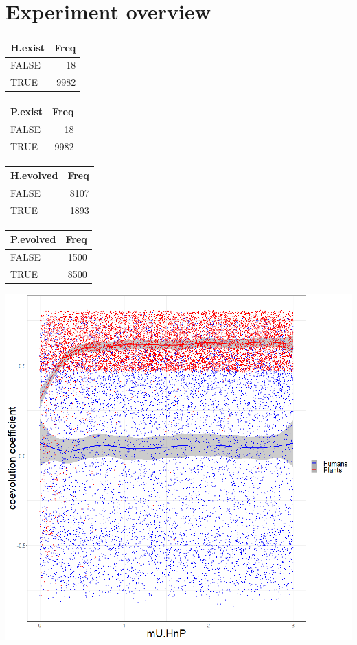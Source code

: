 \documentclass[]{book}
\begin{document}
\newpage

\hypertarget{experiment-overview}{%
\section{Experiment overview}\label{experiment-overview}}

\begin{tabular}{l|r}
\hline
H.exist & Freq\\
\hline
FALSE & 18\\
\hline
TRUE & 9982\\
\hline
\end{tabular}

\begin{tabular}{l|r}
\hline
P.exist & Freq\\
\hline
FALSE & 18\\
\hline
TRUE & 9982\\
\hline
\end{tabular}

\begin{tabular}{l|r}
\hline
H.evolved & Freq\\
\hline
FALSE & 8107\\
\hline
TRUE & 1893\\
\hline
\end{tabular}

\begin{tabular}{l|r}
\hline
P.evolved & Freq\\
\hline
FALSE & 1500\\
\hline
TRUE & 8500\\
\hline
\end{tabular}

\includegraphics[width=1\linewidth]{plots/5_multiplePar-coevo_collapsed-ggplot}
\end{document}
